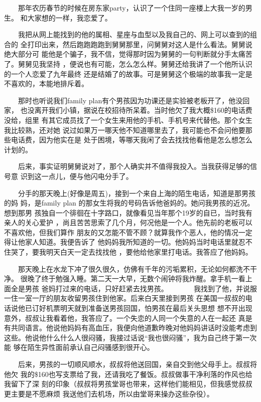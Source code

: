 \documentclass[12pt]{book}
\begin{document}
　　那年农历春节的时候在房东家party，认识了一个住同一座楼上大我一岁的男生。
和大家想的一样，我恋爱了。

　　我把从网上能找到的他的属相、星座与血型以及我自己的、网上可以查到的组合的
全打印出来，然后跑跑跑跑到舅舅那里，问舅舅对这人是什么看法。舅舅说绝大部分可
能他是个骗子，我不信，觉得那时因为舅舅的一句判断就分手太痛苦了。舅舅见我坚持
，便说也有可能，怎么怎么样。舅舅还给我讲了一个他所认识的一个人恋爱了九年最终
还是结婚了的故事。可是舅舅这个极端的故事我一定是不喜欢的，本能地排斥着。

　　那时也听说我们family plan有个男孩因为功课还是实验被老板开了，他没回家，
也没离开我们小镇，据说在校招待所呆着。当时他欠了我大概\$160的电话费没给，组里
有其它成员找了一个女生来用他的手机、手机号来代替他。那个女生我比较熟，还对她
说过如果万一哪天他不知道哪里去了，我可能也不会问他要那些电话费，因为他实在是
处于困境，等哪天我闲了会去找找他看他是怎么想怎么计划的。

　　后来，事实证明舅舅说对了，那个人确实并不值得我投入。当我获得足够的信号意
识到这一点儿，便与他闪电分手了。

　　分手的那天晚上(好像是周五)，接到一个来自上海的陌生电话，知道是那男孩的妈
妈，是family plan 的那女生将我的号码告诉他爸妈的。她问我男孩的近况。想到那男
孩独自一个徘徊在十字路口，就像看见当年那个19岁的自已，当时我有亲人的关心爱护
，尚且苦苦思索了几个月，何况他是一个人。他先前的老板可以不喜欢他，但我们算作
朋友的又怎能不管不顾？就算我作个恶人，他的情况一定得让他家人知道。我便告诉了
他妈妈我所知道的一切。他妈妈当时电话里就忍不住哭了，要我明天白天一定去找找他
，要他给他家里打电话。我答应了他妈妈。

　　那天晚上在水龙下冲了很久很久，仿佛有千年的污垢累积，无论如何都洗不干净。
很晚了终于勉强入睡。第二天一大早，无数个闹钟将我炸醒。拿手机一看上面全是男孩
爸妈打过来的电话，只好赶紧去找男孩。
　
　　我找到了他，并说服一住一室一厅的朋友收留男孩住到他家。后来白天里接到男孩
在美国一叔叔的电话说他已订好机票明天就到准备送男孩回国，怕男孩在最后关头思想
想不开出现意外，叔叔让我看着他，我答应了。一个失恋的人同一个失意的人在一起还
真是有共同语言。他说他妈妈有高血压，我便向他道歉昨晚对他妈妈讲话时没能考虑到
这些。他说他什么什么人很闷骚，我接过话说“我也很闷骚”，我为自己终于第一次能
够在陌生异性面前承认自己闷骚感到很开心。

　　后来，男孩的一切顺风顺水，叔叔将他送回国，亲自交到他父母手上。叔叔将他欠
我的\$160也写支票给了我，还请我吃了餐饭。叔叔做事干净利落的作风也给我留下了深
刻的印象（叔叔将男孩堂哥也带来，这样他们能相见，但我感觉叔叔更主要是不愿麻烦
我送他们去机场，所以由堂哥来操办这些杂役）。
\end{document}
